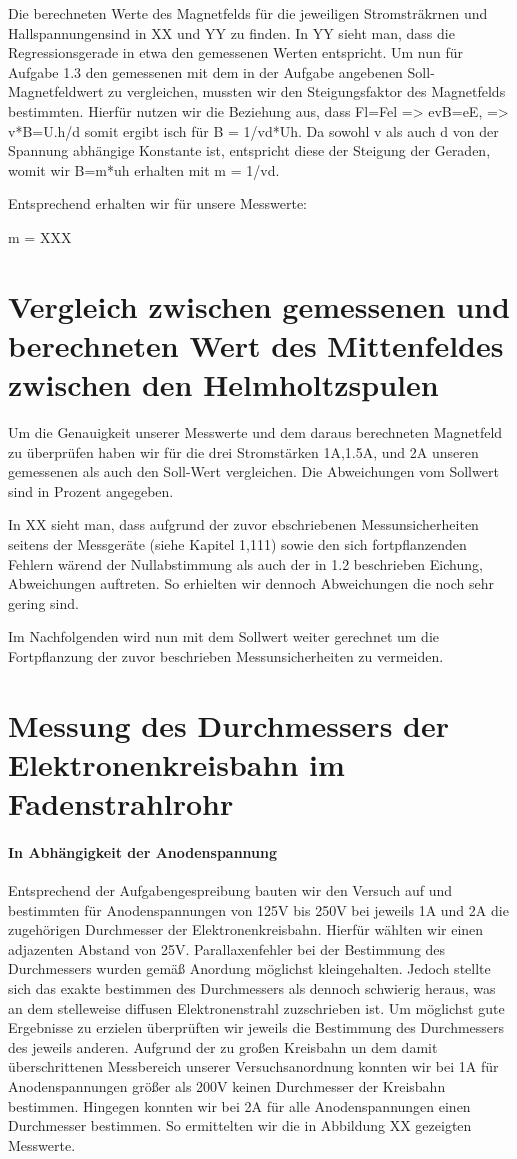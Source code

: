  Die berechneten Werte des Magnetfelds für die jeweiligen Stromsträkrnen und Hallspannungensind in XX und YY zu finden. In YY sieht man, dass die Regressionsgerade in etwa den gemessenen Werten entspricht.
 Um nun für Aufgabe 1.3 den gemessenen mit dem in der Aufgabe angebenen Soll-Magnetfeldwert zu vergleichen, mussten wir den Steigungsfaktor des Magnetfelds bestimmten. Hierfür nutzen wir die Beziehung aus, dass
 Fl=Fel => evB=eE, => v*B=U.h/d
 somit ergibt isch für B = 1/vd*Uh. Da sowohl v als auch d von der Spannung abhängige Konstante ist, entspricht diese der Steigung der Geraden, womit wir B=m*uh erhalten mit m = 1/vd.
 
 Entsprechend erhalten wir für unsere Messwerte:
 
 m = XXX
\section{Vergleich zwischen gemessenen und berechneten Wert des Mittenfeldes zwischen den Helmholtzspulen}
Um die Genauigkeit unserer Messwerte und dem daraus berechneten Magnetfeld zu überprüfen haben wir für die drei Stromstärken 1A,1.5A, und 2A unseren gemessenen als auch den Soll-Wert vergleichen. Die Abweichungen vom Sollwert sind in Prozent angegeben.
 
 In XX sieht man, dass aufgrund der zuvor ebschriebenen Messunsicherheiten seitens der Messgeräte (siehe Kapitel 1,111) sowie den sich fortpflanzenden Fehlern wärend der Nullabstimmung als auch der in 1.2 beschrieben Eichung, Abweichungen auftreten. So erhielten wir dennoch Abweichungen die noch sehr gering sind.
 
 Im Nachfolgenden wird nun mit dem Sollwert weiter gerechnet um die Fortpflanzung der zuvor beschrieben Messunsicherheiten zu vermeiden.
 
 
\section{Messung des Durchmessers der Elektronenkreisbahn im Fadenstrahlrohr}
\paragraph{In Abhängigkeit der Anodenspannung}
Entsprechend der Aufgabengespreibung bauten wir den Versuch auf und bestimmten für Anodenspannungen von 125V bis 250V bei jeweils 1A und 2A die zugehörigen Durchmesser der Elektronenkreisbahn. Hierfür wählten wir einen adjazenten Abstand von 25V. Parallaxenfehler bei der Bestimmung des Durchmessers wurden gemäß Anordung möglichst kleingehalten. Jedoch stellte sich das exakte bestimmen des Durchmessers als dennoch schwierig heraus, was an dem stelleweise diffusen Elektronenstrahl zuzschrieben ist. Um möglichst gute Ergebnisse zu erzielen überprüften wir jeweils die Bestimmung des Durchmessers des jeweils anderen. Aufgrund der zu großen Kreisbahn un dem damit überschrittenen Messbereich unserer Versuchsanordnung konnten wir bei 1A für Anodenspannungen größer als 200V keinen Durchmesser der Kreisbahn bestimmen. Hingegen konnten wir bei 2A für alle Anodenspannungen einen Durchmesser bestimmen. So ermittelten wir die in Abbildung XX gezeigten Messwerte. 




